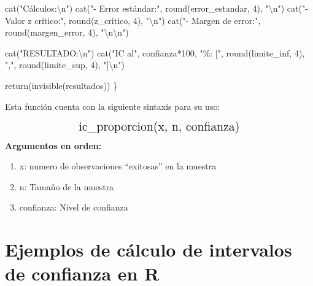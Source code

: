 \documentclass[
  spanish,
  letterpaper,
]{book}
\newenvironment{Shaded}{\begin{snugshade}}{\end{snugshade}}
\newcommand{\DecValTok}[1]{\textcolor[rgb]{0.68,0.00,0.00}{#1}}
\newcommand{\FunctionTok}[1]{\textcolor[rgb]{0.28,0.35,0.67}{#1}}
\newcommand{\NormalTok}[1]{\textcolor[rgb]{0.00,0.23,0.31}{#1}}
\newcommand{\SpecialCharTok}[1]{\textcolor[rgb]{0.37,0.37,0.37}{#1}}
\newcommand{\StringTok}[1]{\textcolor[rgb]{0.13,0.47,0.30}{#1}}
\begin{document}
\begin{Shaded}
\begin{Highlighting}[]
  \FunctionTok{cat}\NormalTok{(}\StringTok{"Cálculos:}\SpecialCharTok{\textbackslash{}n}\StringTok{"}\NormalTok{)}
  \FunctionTok{cat}\NormalTok{(}\StringTok{"{-} Error estándar:"}\NormalTok{, }\FunctionTok{round}\NormalTok{(error\_estandar, }\DecValTok{4}\NormalTok{), }\StringTok{"}\SpecialCharTok{\textbackslash{}n}\StringTok{"}\NormalTok{)}
  \FunctionTok{cat}\NormalTok{(}\StringTok{"{-} Valor z crítico:"}\NormalTok{, }\FunctionTok{round}\NormalTok{(z\_critico, }\DecValTok{4}\NormalTok{), }\StringTok{"}\SpecialCharTok{\textbackslash{}n}\StringTok{"}\NormalTok{)}
  \FunctionTok{cat}\NormalTok{(}\StringTok{"{-} Margen de error:"}\NormalTok{, }\FunctionTok{round}\NormalTok{(margen\_error, }\DecValTok{4}\NormalTok{), }\StringTok{"}\SpecialCharTok{\textbackslash{}n\textbackslash{}n}\StringTok{"}\NormalTok{)}
  
  \FunctionTok{cat}\NormalTok{(}\StringTok{"RESULTADO:}\SpecialCharTok{\textbackslash{}n}\StringTok{"}\NormalTok{)}
  \FunctionTok{cat}\NormalTok{(}\StringTok{"IC al"}\NormalTok{, confianza}\SpecialCharTok{*}\DecValTok{100}\NormalTok{, }\StringTok{"\%: ["}\NormalTok{, }\FunctionTok{round}\NormalTok{(limite\_inf, }\DecValTok{4}\NormalTok{), }
      \StringTok{","}\NormalTok{, }\FunctionTok{round}\NormalTok{(limite\_sup, }\DecValTok{4}\NormalTok{), }\StringTok{"]}\SpecialCharTok{\textbackslash{}n}\StringTok{"}\NormalTok{)}
  
  \FunctionTok{return}\NormalTok{(}\FunctionTok{invisible}\NormalTok{(resultados))}
\NormalTok{\}}
\end{Highlighting}
\end{Shaded}

Esta función cuenta con la siguiente sintaxis para su uso:

\[
\Large \text{ic\_proporcion(x, n, confianza)}
\] \textbf{Argumentos en orden:}

\begin{enumerate}
\def\labelenumi{\arabic{enumi}.}
\item
  x: numero de observaciones ``exitosas'' en la muestra
\item
  n: Tamaño de la muestra
\item
  confianza: Nivel de confianza
\end{enumerate}

\section{Ejemplos de cálculo de intervalos de confianza en
R}\label{ejemplos-de-cuxe1lculo-de-intervalos-de-confianza-en-r}
\end{document}
